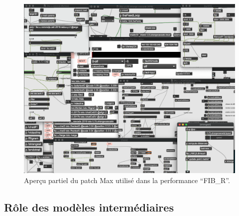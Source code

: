 \begin{figure}[!htbp]
	\captionsetup{format=plain}
	\includegraphics[width=\textwidth]{gfx/04_algorithms/FIBR-patch.png}
	\caption[Aperçu d'un patch Max]{Aperçu partiel du patch Max utilisé dans la performance ``FIB\_R''.}
	\label{fig:algorithms:FIBR-patch}
\end{figure}

\subsection{Rôle des modèles intermédiaires}

